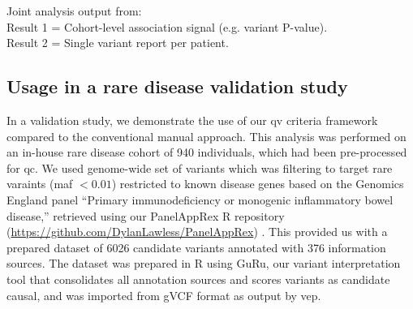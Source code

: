 \begin{tcolorbox}[
    colback=white!0,
    colframe=black,
    boxrule=1pt,
    arc=1mm,
    outer arc=1mm,
    title=\textbf{\refstepcounter{myboxcounter}\label{box:pipe}Box \themyboxcounter: Example diagrammatic representation}
]
\medskip

Joint analysis output from:\\
Result 1 = Cohort-level association signal (e.g. variant P-value).\\
Result 2 = Single variant report per patient.
\end{tcolorbox}

\subsection{Usage in a rare disease validation study}

In a validation study, we demonstrate the use of our \ac{qv} criteria framework 
compared to the conventional manual approach. 
This analysis was performed on an in-house rare disease cohort of 940 individuals, which had been pre-processed for \ac{qc}. %
We used genome-wide set of variants which was filtering to target rare varaints (\ac{maf} $< 0.01$) restricted to known disease genes based on the Genomics England panel ``Primary immunodeficiency or monogenic inflammatory bowel disease,'' retrieved using our PanelAppRex R repository (\url{https://github.com/DylanLawless/PanelAppRex}) 
\cite{lawless_panelapprex_2025}. 
This provided us with a prepared dataset of 6026 candidate variants annotated with 376 information sources.
The dataset was prepared in R using GuRu, our variant interpretation tool that consolidates all annotation sources and scores variants as candidate causal, and was imported from gVCF format as output by \ac{vep}.

